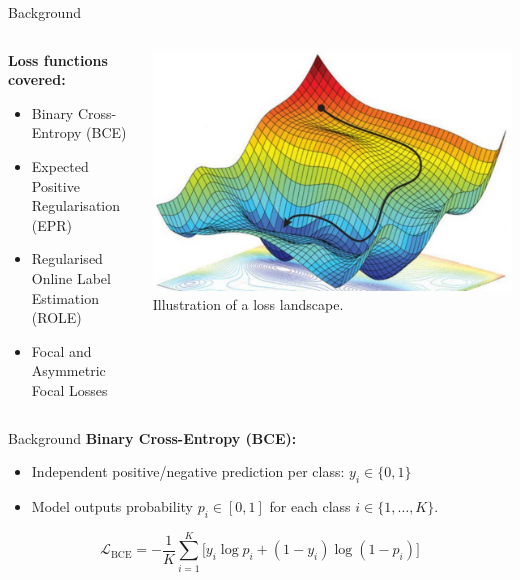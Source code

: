 \begin{frame}{Background}
  \begin{columns}
    \begin{column}{0.55\textwidth}
      \textbf{Loss functions covered:}
          \begin{itemize}
            \item Binary Cross-Entropy (BCE)
            \item Expected Positive Regularisation (EPR)
            \item Regularised Online Label Estimation (ROLE)
            \item Focal and Asymmetric Focal Losses
          \end{itemize}
    \end{column}

    \begin{column}{0.45\textwidth}
      \centering
      \includegraphics[width=0.9\linewidth]{Images/loss_optimization.png}\\
      \scriptsize Illustration of a loss landscape.
    \end{column}
  \end{columns}
\end{frame}


\begin{frame}{Background}
\textbf{Binary Cross-Entropy (BCE):} 
  \begin{itemize}
    \item Independent positive/negative prediction per class: $y_i\in\{0,1\}$
    \item Model outputs probability $p_i \in [0,1]$ for each class $i\in\{1,\dots,K\}$.
  \end{itemize}
  \vspace{0.4em}
  \begin{equation*}
    \mathcal{L}_{\text{BCE}} = -\frac{1}{K}\sum_{i=1}^{K}\bigl[y_i\log p_i + (1-y_i)\log(1-p_i)\bigr]
  \end{equation*}
\end{frame}

